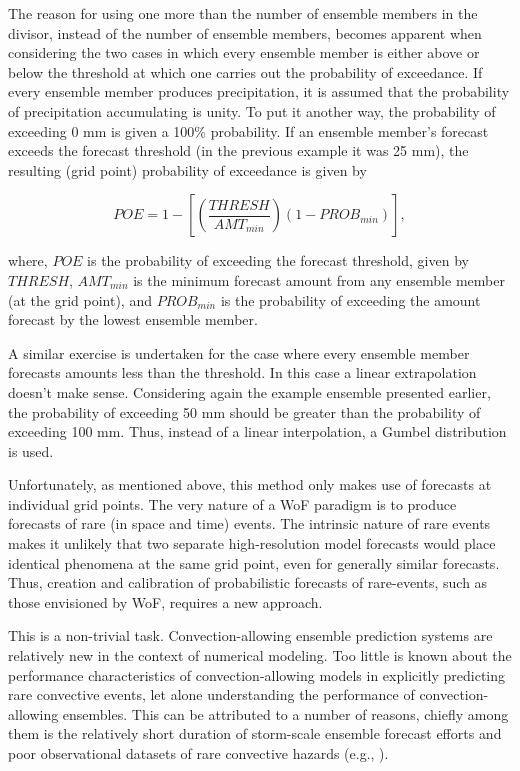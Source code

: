 The reason for using one more than the number of ensemble members in the divisor, instead of the number of ensemble members, becomes apparent when considering the two cases in which every ensemble member is either above or below the threshold at which one carries out the probability of exceedance. If every ensemble member produces precipitation, it is assumed that the probability of precipitation accumulating is unity. To put it another way, the probability of exceeding 0 mm is given a 100\% probability. If an ensemble member's forecast exceeds the forecast threshold (in the previous example it was 25 mm), the resulting (grid point) probability of exceedance is given by


$$
    POE = 1 - \left[\left(\frac{THRESH}{AMT_{min}}\right)(1 - PROB_{min})\right],
$$


\noindent where, $POE$ is the probability of exceeding the forecast threshold, given by $THRESH$, $AMT_{min}$ is the minimum forecast amount from any ensemble member (at the grid point), and $PROB_{min}$ is the probability of exceeding the amount forecast by the lowest ensemble member.


A similar exercise is undertaken for the case where every ensemble member forecasts amounts less than the threshold. In this case a linear extrapolation doesn't make sense. Considering again the example ensemble presented earlier, the probability of exceeding 50 mm should be greater than the probability of exceeding 100 mm. Thus, instead of a linear interpolation, a Gumbel distribution is used.


Unfortunately, as mentioned above, this method only makes use of forecasts at individual grid points. The very nature of a WoF paradigm is to produce forecasts of rare (in space and time) events. The intrinsic nature of rare events makes it unlikely that two separate high-resolution model forecasts would place identical phenomena at the same grid point, even for generally similar forecasts. Thus, creation and calibration of probabilistic forecasts of rare-events, such as those envisioned by WoF, requires a new approach.


This is a non-trivial task. Convection-allowing ensemble prediction systems are relatively new in the context of numerical modeling. Too little is known about the performance characteristics of convection-allowing models in explicitly predicting rare convective events, let alone understanding the performance of convection-allowing ensembles. This can be attributed to a number of reasons, chiefly among them is the relatively short duration of storm-scale ensemble forecast efforts \citep{done2004cams, clark2012overview} and poor observational datasets of rare convective hazards (e.g., \citealp{doswell1988stormreports, weiss2002stormreports, trapp2006stormreports, ortega2009shave}).


